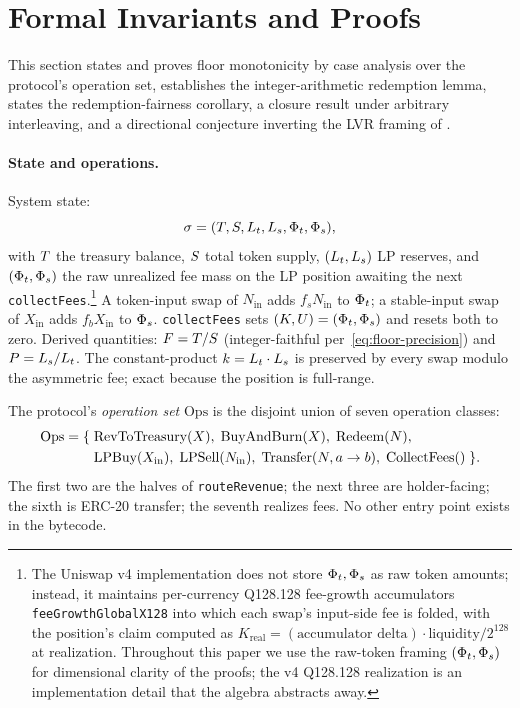 \section{Formal Invariants and Proofs}
\label{sec:formal-invariants}

This section states and proves floor monotonicity by case analysis over the protocol's operation set, establishes the integer-arithmetic redemption lemma, states the redemption-fairness corollary, a closure result under arbitrary interleaving, and a directional conjecture inverting the LVR framing of \citet{MilionisMoallemiRoughgarden2023}.

\paragraph{State and operations.} System state:
\begin{equation}
\sigma = (T, S, L_t, L_s, \Phi_t, \Phi_s),
\label{eq:state}
\end{equation}
with $T$ the treasury balance, $S$ total token supply, $(L_t, L_s)$ LP reserves, and $(\Phi_t, \Phi_s)$ the raw unrealized fee mass on the LP position awaiting the next \texttt{collectFees}.\footnote{The Uniswap v4 implementation does not store $\Phi_t, \Phi_s$ as raw token amounts; instead, it maintains per-currency Q128.128 fee-growth accumulators \texttt{feeGrowthGlobalX128} into which each swap's input-side fee is folded, with the position's claim computed as $K_{\text{real}} = (\text{accumulator delta}) \cdot \text{liquidity} / 2^{128}$ at realization. Throughout this paper we use the raw-token framing $(\Phi_t, \Phi_s)$ for dimensional clarity of the proofs; the v4 Q128.128 realization is an implementation detail that the algebra abstracts away.} A token-input swap of $N_{\text{in}}$ adds $f_s N_{\text{in}}$ to $\Phi_t$; a stable-input swap of $X_{\text{in}}$ adds $f_b X_{\text{in}}$ to $\Phi_s$. \texttt{collectFees} sets $(K, U) = (\Phi_t, \Phi_s)$ and resets both to zero. Derived quantities: $F = T/S$ (integer-faithful per~\eqref{eq:floor-precision}) and $P = L_s/L_t$. The constant-product $k = L_t \cdot L_s$ is preserved by every swap modulo the asymmetric fee; exact because the position is full-range.

The protocol's \emph{operation set} $\mathrm{Ops}$ is the disjoint union of seven operation classes:
\begin{align}
\mathrm{Ops} = \{\;
  &\text{RevToTreasury}(X),
  \;\text{BuyAndBurn}(X),
  \;\text{Redeem}(N), \notag \\
  &\text{LPBuy}(X_{\text{in}}),
  \;\text{LPSell}(N_{\text{in}}),
  \;\text{Transfer}(N, a \to b),
  \;\text{CollectFees}() \;\}.
\label{eq:ops}
\end{align}
The first two are the halves of \texttt{routeRevenue}; the next three are holder-facing; the sixth is ERC-20 transfer; the seventh realizes fees. No other entry point exists in the bytecode.

